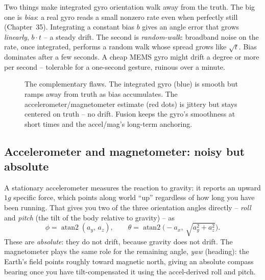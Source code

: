 \begin{happeningbox}
Two things make integrated gyro orientation walk away from the truth. The big one is
\emph{bias}: a real gyro reads a small nonzero rate even when perfectly still (Chapter~35). Integrating a constant bias $b$ gives an angle error that
grows \emph{linearly}, $b\cdot t$ -- a steady drift. The second is \emph{random-walk}:
broadband noise on the rate, once integrated, performs a random walk whose spread grows
like $\sqrt{t}$. Bias dominates after a few seconds. A cheap MEMS gyro might drift a
degree or more per second -- tolerable for a one-second gesture, ruinous over a minute.
\end{happeningbox}

\begin{figure}[H]
\centering
{}
\caption{The complementary flaws. The integrated gyro (blue) is smooth but ramps away
from truth as bias accumulates. The accelerometer/magnetometer estimate (red dots) is
jittery but stays centered on truth -- no drift. Fusion keeps the gyro's smoothness at
short times and the accel/mag's long-term anchoring.}
\label{ch36:fig-drift}
\end{figure}

\subsection{Accelerometer and magnetometer: noisy but absolute}
\label{ch36:absolute}

A stationary accelerometer measures the reaction to gravity: it reports an upward $1g$
specific force, which points along world ``up'' regardless of how long you have been
running. That gives you two of the three orientation angles directly -- \emph{roll} and
\emph{pitch} (the tilt of the body relative to gravity) -- as
\[
  \phi = \operatorname{atan2}(a_y,\,a_z), \qquad
  \theta = \operatorname{atan2}\!\big(-a_x,\ \sqrt{a_y^2+a_z^2}\big).
\]
These are \emph{absolute}: they do not drift, because gravity does not drift. The
magnetometer plays the same role for the remaining angle, \emph{yaw} (heading): the
Earth's field points roughly toward magnetic north, giving an absolute compass bearing
once you have tilt-compensated it using the accel-derived roll and pitch.

